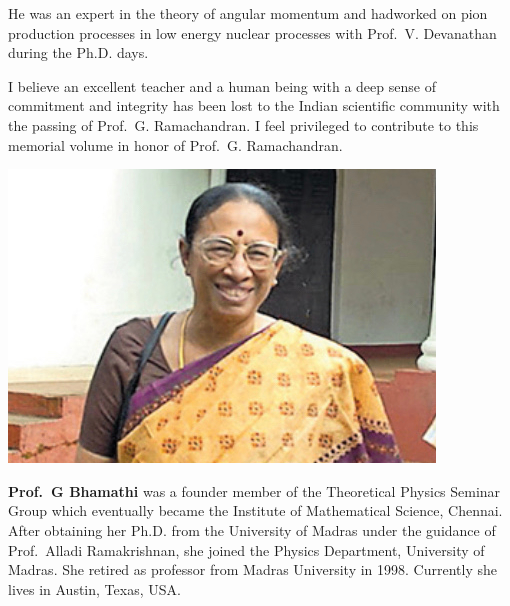 He was an expert in the theory of angular momentum and had\break worked on pion production processes in low energy nuclear processes with Prof.\ V. Devanathan during the Ph.D. days. 

I believe an excellent teacher and a human being with a deep sense of commitment and integrity has been lost to the Indian scientific community with the passing of Prof.\ G. Ramachandran. I feel privileged to contribute to this memorial volume in honor of Prof.\ G. Ramachandran.
\bigskip

\drawline
\bigskip
\bigskip


\centerline{\includegraphics[scale=.4]{authorsphotos/G_Bhamathi.jpg}}
\bigskip

\noindent
{\biofntsize\textbf{Prof.\ G Bhamathi} was a founder member of the Theoretical Physics Seminar Group which eventually became the Institute of Mathematical Science, Chennai. After obtaining her Ph.D. from the University of Madras under the guidance of Prof.\ Alladi Ramakrishnan, she joined the Physics Department, University of Madras. She retired as professor from Madras University in 1998. Currently she lives in Austin, Texas, USA.}

